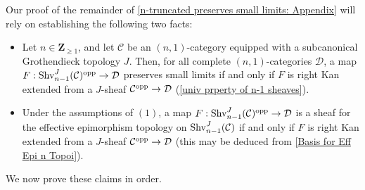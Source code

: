 \documentclass[10pt]{article}
\newcommand{\C}{\mathcal C}
\newcommand{\cD}{\mathcal{D}}
\newcommand{\ZZ}{\mathbb{Z}}
\def\ZZ{{\mathbf Z}}
\theoremstyle{witharg}
\theoremstyle{witharg}
\theoremstyle{witharg2}
\begin{document}
Our proof of the remainder of \ref{n-truncated preserves small limits: Appendix} will rely on establishing the following two facts:

\begin{itemize}

    \item [$(1)$] Let $n\in \ZZ_{\geq 1}$, and let $\C$ be an $(n,1)$-category equipped with a subcanonical Grothendieck topology $J$. Then, for all complete $(n,1)$-categories $\cD$, a map $F:\textnormal{Shv}^J_{n-1}(\C)^{\textnormal{opp}}\rightarrow \cD$ preserves small limits if and only if $F$ is right Kan extended from a $J$-sheaf $\C^{\textnormal{opp}}\rightarrow \cD$ (\ref{univ prperty of n-1 sheaves}).

    \item [$(2)$] Under the assumptions of $(1)$, a map $F:\textnormal{Shv}^J_{n-1}(\C)^{\textnormal{opp}}\rightarrow \cD$ is a sheaf for the effective epimorphism topology on $\textnormal{Shv}^J_{n-1}(\C)$ if and only if $F$ is right Kan extended from a $J$-sheaf $\C^{\textnormal{opp}}\rightarrow \cD$ (this may be deduced from \ref{Basis for Eff Epi n Topoi}).
    
\end{itemize}

\noindent We now prove these claims in order. 
\end{document}
